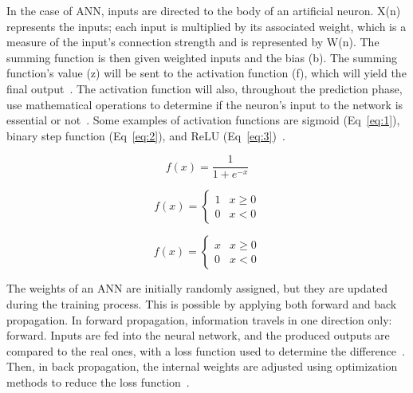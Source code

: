 \begin{itemize}
    In the case of \gls{ANN}, inputs are directed to the body of an artificial neuron. X(n) represents the inputs; each input is multiplied by its associated weight, which is a measure of the input's connection strength and is represented by W(n). The summing function is then given weighted inputs and the bias (b). The summing function's value (z) will be sent to the activation function (f), which will yield the final output~\cite{Imran2019AClassification}. The activation function will also, throughout the prediction phase, use mathematical operations to determine if the neuron's input to the network is essential or not~\cite{Baheti12Choose}. Some examples of activation functions are sigmoid (Eq~\ref{eq:1}), binary step function (Eq~\ref{eq:2}), and ReLU (Eq~\ref{eq:3})~\cite{Gupta2020ActivationLearning}.
    
    
    \begin{equation}\label{eq:1}
        f(x) = \frac{1}{1+e^{-x}}
    \end{equation}
    
    \begin{equation}\label{eq:2}
        f(x) = \begin{cases}1 & x \geq 0\\0 & x < 0\end{cases}
    \end{equation}
    
    \begin{equation} \label{eq:3}
        f(x) = \begin{cases}x & x \geq 0\\0 & x < 0\end{cases}
    \end{equation}
    
    The weights of an \gls{ANN} are initially randomly assigned, but they are updated during the training process. This is possible by applying both forward and back propagation. In forward propagation, information travels in one direction only: forward. Inputs are fed into the neural network, and the produced outputs are compared to the real ones, with a loss function used to determine the difference~\cite{DivakarForwardNetworks}. Then, in back propagation, the internal weights are adjusted using optimization methods to reduce the loss function~\cite{Baheti12Choose}. 
    

\end{itemize}

